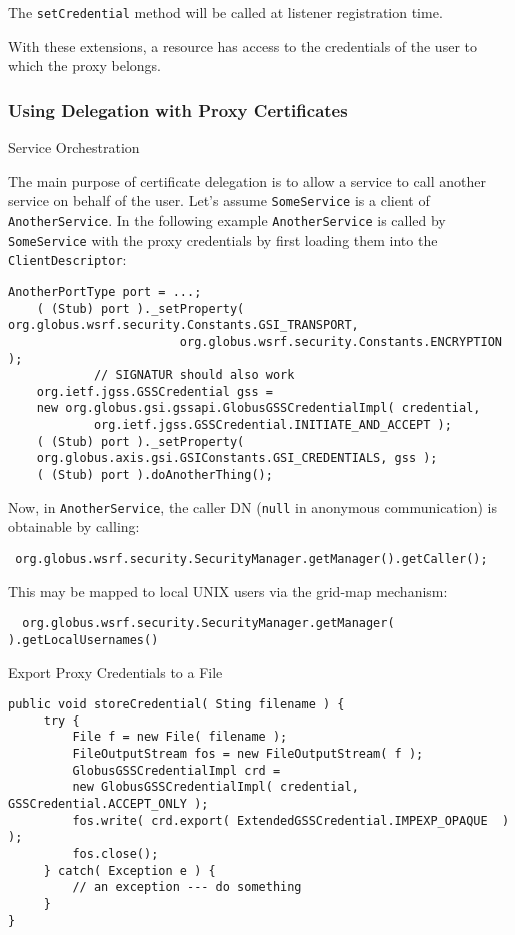 \documentclass{article}
\begin{document}
The \verb!setCredential! method will be called at listener
registration time.

With these extensions, a resource has access to the credentials of
the user to which the proxy belongs.

\subsubsection{Using Delegation with Proxy Certificates}

Service Orchestration

The main purpose of certificate delegation is to allow a service to
call another service on behalf of the user. Let's assume
\verb!SomeService! is a client of \verb!AnotherService!. In the
following example \verb!AnotherService! is called by
\verb!SomeService! with the proxy credentials by first loading them
into the \verb!ClientDescriptor!:

\begin{verbatim}
AnotherPortType port = ...;
    ( (Stub) port )._setProperty( org.globus.wsrf.security.Constants.GSI_TRANSPORT,
                        org.globus.wsrf.security.Constants.ENCRYPTION );
            // SIGNATUR should also work
    org.ietf.jgss.GSSCredential gss = 
    new org.globus.gsi.gssapi.GlobusGSSCredentialImpl( credential,
            org.ietf.jgss.GSSCredential.INITIATE_AND_ACCEPT );
    ( (Stub) port )._setProperty( 
    org.globus.axis.gsi.GSIConstants.GSI_CREDENTIALS, gss );
    ( (Stub) port ).doAnotherThing();
\end{verbatim}

Now, in \verb!AnotherService!, the caller DN (\verb!null! in
anonymous communication) is obtainable by calling:

\begin{verbatim}
 org.globus.wsrf.security.SecurityManager.getManager().getCaller();
\end{verbatim}

This may be mapped to local UNIX users via the grid-map mechanism:

\begin{verbatim}
  org.globus.wsrf.security.SecurityManager.getManager( ).getLocalUsernames()
\end{verbatim}

Export Proxy Credentials to a File


\begin{verbatim}
public void storeCredential( Sting filename ) {
     try {
         File f = new File( filename );
         FileOutputStream fos = new FileOutputStream( f );
         GlobusGSSCredentialImpl crd = 
         new GlobusGSSCredentialImpl( credential, GSSCredential.ACCEPT_ONLY );
         fos.write( crd.export( ExtendedGSSCredential.IMPEXP_OPAQUE  ) );
         fos.close();
     } catch( Exception e ) {
         // an exception --- do something
     }
}
\end{verbatim}
\end{document}
